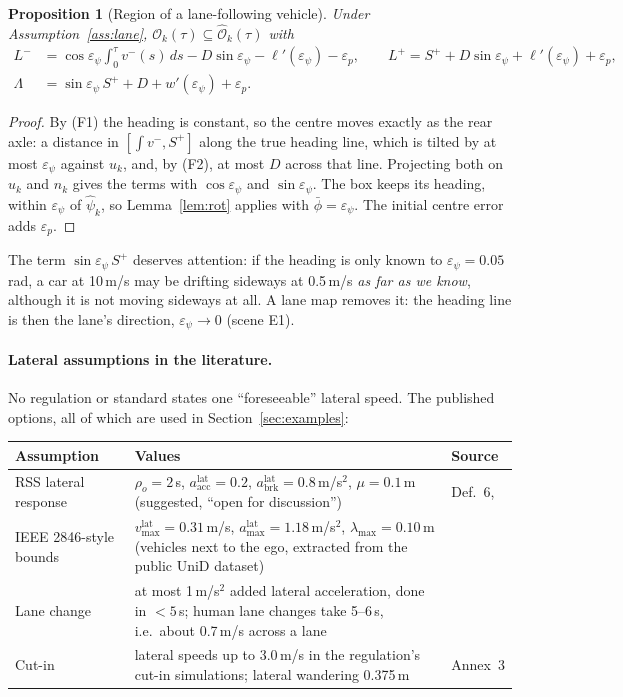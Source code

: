 \documentclass[11pt]{article}
\newtheorem{proposition}{Proposition}
\theoremstyle{definition}
\theoremstyle{remark}
\newcommand{\Occ}{\mathcal{O}}
\newcommand{\Ohat}{\widehat{\mathcal{O}}}
\begin{document}
\begin{proposition}[Region of a lane-following vehicle]\label{prop:lane}
Under Assumption~\ref{ass:lane}, $\Occ_k(\tau)\subseteq\Ohat_k(\tau)$ with
\begin{align*}
L^-&=\cos\varepsilon_\psi\int_0^\tau v^-(s)\,ds-D\sin\varepsilon_\psi-\ell'(\varepsilon_\psi)-\varepsilon_p,\qquad
L^+=S^++D\sin\varepsilon_\psi+\ell'(\varepsilon_\psi)+\varepsilon_p,\\
\Lambda&=\sin\varepsilon_\psi\,S^++D+w'(\varepsilon_\psi)+\varepsilon_p.
\end{align*}
\end{proposition}
\begin{proof}
By (F1) the heading is constant, so the centre moves exactly as the rear axle: a distance in
$[\int v^-,S^+]$ along the true heading line, which is tilted by at most $\varepsilon_\psi$ against $u_k$, and,
by (F2), at most $D$ across that line. Projecting both on $u_k$ and $n_k$ gives the terms with
$\cos\varepsilon_\psi$ and $\sin\varepsilon_\psi$. The box keeps its heading, within $\varepsilon_\psi$ of
$\hat\psi_k$, so Lemma~\ref{lem:rot} applies with $\bar\phi=\varepsilon_\psi$. The initial centre error adds
$\varepsilon_p$.
\end{proof}

The term $\sin\varepsilon_\psi\,S^+$ deserves attention: if the heading is only known to
$\varepsilon_\psi=0.05$\,rad, a car at 10\,m/s may be drifting sideways at 0.5\,m/s \emph{as far as we know},
although it is not moving sideways at all. A lane map removes it: the heading line is then the lane's
direction, $\varepsilon_\psi\to0$ (scene E1).

\paragraph{Lateral assumptions in the literature.} No regulation or standard states one ``foreseeable''
lateral speed. The published options, all of which are used in Section~\ref{sec:examples}:
\begin{center}
\begin{tabular}{p{3.6cm}p{6.6cm}p{4.6cm}}
\toprule
Assumption & Values & Source \\
\midrule
RSS lateral response & $\rho_o=2$\,s, $a^{\mathrm{lat}}_{\mathrm{acc}}=0.2$, $a^{\mathrm{lat}}_{\mathrm{brk}}=0.8$\,m/s$^2$, $\mu=0.1$\,m (suggested, ``open for discussion'') & \cite{rss2017} Def.~6, \cite{adrsslib} \\
IEEE 2846-style bounds & $v^{\mathrm{lat}}_{\max}=0.31$\,m/s, $a^{\mathrm{lat}}_{\max}=1.18$\,m/s$^2$, $\lambda_{\max}=0.10$\,m (vehicles next to the ego, extracted from the public UniD dataset) & \cite{ieee2846,certad2023} \\
Lane change & at most 1\,m/s$^2$ added lateral acceleration, done in $<5$\,s; human lane changes take 5--6\,s, i.e.\ about 0.7\,m/s across a lane & \cite{unr79,toledo2007} \\
Cut-in & lateral speeds up to 3.0\,m/s in the regulation's cut-in simulations; lateral wandering 0.375\,m & \cite{unr157} Annex~3 \\
\bottomrule
\end{tabular}
\end{center}
\end{document}
